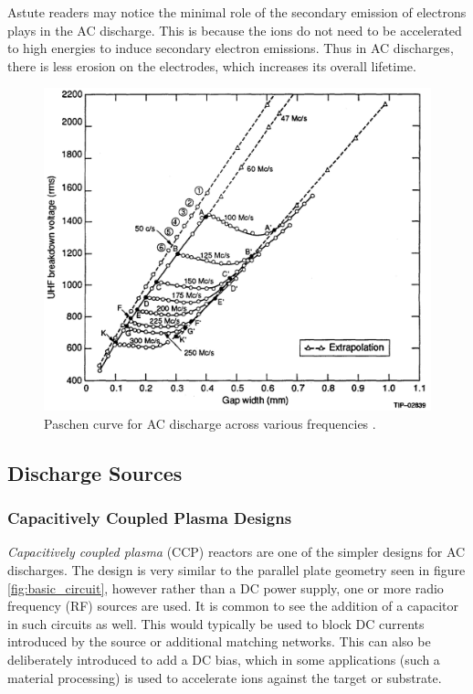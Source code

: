 Astute readers may notice the minimal role of the secondary emission of electrons plays in the AC discharge. This is because the ions do not need to be accelerated to high energies to induce secondary electron emissions. Thus in AC discharges, there is less erosion on the electrodes, which increases its overall lifetime. 


\begin{figure}[h!]
	\centering
	\includegraphics[width=\linewidth]{chapter_2/figures/ac_breakdown.png}
	\caption{Paschen curve for AC discharge across various frequencies \cite{Pim1949}.}
	\label{fig:ac_breakdown}
\end{figure} 


\subsection{Discharge Sources}
\subsubsection{Capacitively Coupled Plasma Designs}

\textit{Capacitively coupled plasma} (CCP) reactors are one of the simpler designs for AC discharges. The design is very similar to the parallel plate geometry seen in figure \ref{fig:basic_circuit}, however rather than a DC power supply, one or more radio frequency (RF) sources are used. It is common to see the addition of a capacitor in such circuits as well. This would typically be used to block DC currents introduced by the source or additional matching networks. This can also be deliberately introduced to add a DC bias, which in some applications (such a material processing) is used to accelerate ions against the target or substrate.

